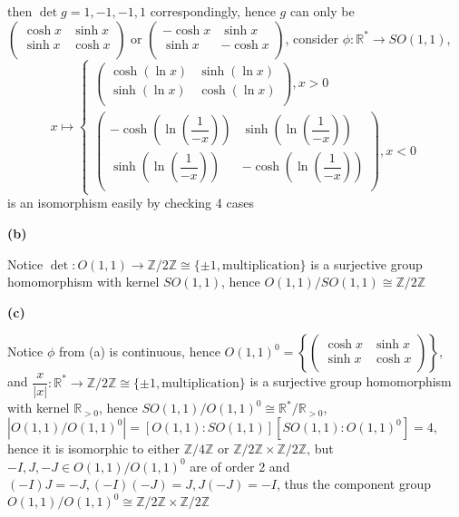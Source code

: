 \documentclass[main]{subfiles}
\begin{document}
then $\det{g}=1,-1,-1,1$ correspondingly, hence $g$ can only be $\left( {\begin{array}{cc}
   \cosh{x} & \sinh x \\
   \sinh{x} & \cosh{x} \\
  \end{array} } \right)$ or $\left( {\begin{array}{cc}
   -\cosh{x} & \sinh{x} \\
   \sinh{x} & -\cosh{x} \\
  \end{array} } \right)$, consider $\phi:\mathbb{R}^*\rightarrow SO(1,1)$, 
  $$x\mapsto\begin{cases}
  \left( {\begin{array}{cc}
   \cosh{\left(\ln{x}\right)} & \sinh{\left(\ln{x}\right)} \\
   \sinh{\left(\ln{x}\right)} & \cosh{\left(\ln{x}\right)} \\
  \end{array} } \right), x>0\\
  \left( {\begin{array}{cc}
   -\cosh{\left(\ln{\left(\dfrac{1}{-x}\right)}\right)} & \sinh{\left(\ln{\left(\dfrac{1}{-x}\right)}\right)} \\
   \sinh{\left(\ln{\left(\dfrac{1}{-x}\right)}\right)} & -\cosh{\left(\ln{\left(\dfrac{1}{-x}\right)}\right)} \\
  \end{array} } \right), x<0
  \end{cases}$$
is an isomorphism easily by checking 4 cases \par
\textbf{(b)} \par
Notice $\det:O(1,1)\rightarrow\mathbb{Z}/2\mathbb{Z}\cong\{\pm1,\text{multiplication}\}$ is a surjective group homomorphism with kernel $SO(1,1)$, hence $O(1,1)/SO(1,1)\cong\mathbb{Z}/2\mathbb{Z}$ \par
\textbf{(c)} \par
Notice $\phi$ from (a) is continuous, hence $O(1,1)^0=\left\{\left( {\begin{array}{cc}
   \cosh{x} & \sinh x \\
   \sinh{x} & \cosh{x} \\
  \end{array} } \right)\right\}$, and $\dfrac{x}{|x|}:\mathbb{R}^*\rightarrow\mathbb{Z}/2\mathbb{Z}\cong\{\pm1,\text{multiplication}\}$ is a surjective group homomorphism with kernel $\mathbb{R}_{>0}$, hence $SO(1,1)/O(1,1)^0\cong\mathbb{R}^*/\mathbb{R}_{>0}$, $\left|O(1,1)/O(1,1)^0\right|=\left[O(1,1):SO(1,1)\right]\left[SO(1,1):O(1,1)^0\right]=4$, hence it is isomorphic to either $\mathbb{Z}/4\mathbb{Z}$  or $\mathbb{Z}/2\mathbb{Z}\times \mathbb{Z}/2\mathbb{Z}$, but $-I,J,-J\in O(1,1)/O(1,1)^0$ are of order 2 and $(-I)J=-J,(-I)(-J)=J,J(-J)=-I$, thus the component group $O(1,1)/O(1,1)^0\cong\mathbb{Z}/2\mathbb{Z}\times \mathbb{Z}/2\mathbb{Z}$ \par
\end{document}

